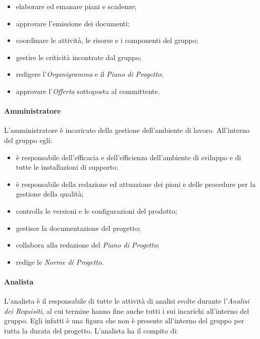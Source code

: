 			\begin{itemize}
				\item elaborare ed emanare piani e scadenze;
				\item approvare l'emissione dei documenti;
				\item coordinare le attività, le risorse e i componenti del gruppo;
				\item gestire le criticità incontrate dal gruppo;
				\item redigere l'\textit{Organigramma} e il \textit{Piano di Progetto};
				\item approvare l'\textit{Offerta} sottoposta al committente.
			\end{itemize}
		
		\paragraph{Amministratore}
		
			L'amministratore è incaricato della gestione dell'ambiente di lavoro.
			\newline
			All'interno del gruppo egli:
			
			\begin{itemize}
				\item è responsabile dell'efficacia e dell'efficienza dell'ambiente di sviluppo e di tutte le installazioni di supporto;
				\item è responsabile della redazione ed attuazione dei piani e delle procedure per la gestione della qualità;
				\item controlla le versioni e le configurazioni del prodotto;
				\item gestisce la documentazione del progetto;
				\item collabora alla redazione del \textit{Piano di Progetto};
				\item redige le \textit{Norme di Progetto}.
			\end{itemize}
		
		\paragraph{Analista}
		
			L'analista è il responsabile di tutte le attività di analisi svolte durante l'\textit{Analisi dei Requisiti}, al cui termine hanno fine anche tutti i sui incarichi all'interno del gruppo. Egli infatti è una figura che non è presente all'interno del gruppo per tutta la durata del progetto.
			\newline
			L'analista ha il compito di:
			
